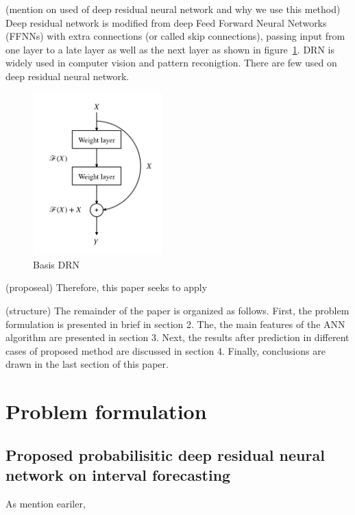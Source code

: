 \documentclass[review]{elsarticle}
\begin{document}
  (mention on used of deep residual neural network and why we use this method)
  Deep residual network is modified from deep Feed Forward Neural Networks (FFNNs) with extra connections (or called skip connections), passing input from one layer to a late layer as well as the next layer as shown in figure~\ref{Fig:Basic_DRN}. DRN is widely used in computer vision and pattern reconigtion. There are few used on deep residual neural network.

  \begin{figure}[H]
    \caption{Basis DRN}
    \label{Fig:Basic_DRN}
    \includegraphics[width=5cm]{basic_DRN}
    \centering
  \end{figure}


  (proposeal) Therefore, this paper seeks to apply

  (structure) The remainder of the paper is organized as follows. First, the problem formulation is presented in brief in section 2. The, the main features of the ANN algorithm are presented in section 3. Next, the results after prediction in different cases of proposed method  are discussed in section 4. Finally, conclusions are drawn in the last section of this paper.
\section{Problem formulation}

  \subsection{Proposed probabilisitic deep residual neural network on interval forecasting}

    As mention eariler,
\end{document}
